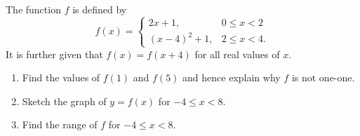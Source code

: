\begin{problem}
    The function $f$ is defined by \[f(x) =
        \begin{cases}
            2x+1, & 0 \leq x < 2\\
            (x-4)^2+1, & 2 \leq x < 4.
        \end{cases}\] It is further given that $f(x) = f(x+4)$ for all real values of $x$.

    \begin{enumerate}
        \item Find the values of $f(1)$ and $f(5)$ and hence explain why $f$ is not one-one.
        \item Sketch the graph of $y = f(x)$ for $-4 \leq x < 8$.
        \item Find the range of $f$ for $-4 \leq x < 8$.
    \end{enumerate}
\end{problem}
